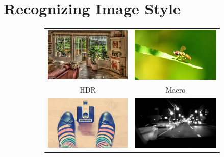 \chapter{Recognizing Image Style}\label{sec:style_chapter}

\begin{figure}[t]
\small{
\centering
\begin{subfigure}[t]{0.48\linewidth}
    \begin{tabular}{cc}
        \includegraphics[width=.43\linewidth]{../style/figures/flickrDatasetExamples/used/resized/hdr.jpg} &
    \includegraphics[width=.43\linewidth]{../style/figures/flickrDatasetExamples/used/resized/macro.jpg} \\
    HDR & Macro \\
        \includegraphics[width=.43\linewidth]{../style/figures/flickrDatasetExamples/used/resized/vintage.jpg} &
    \includegraphics[width=.43\linewidth]{../style/figures/flickrDatasetExamples/used/resized/noir.jpg} \\

\end{tabular}
\end{subfigure}}
\end{figure}
